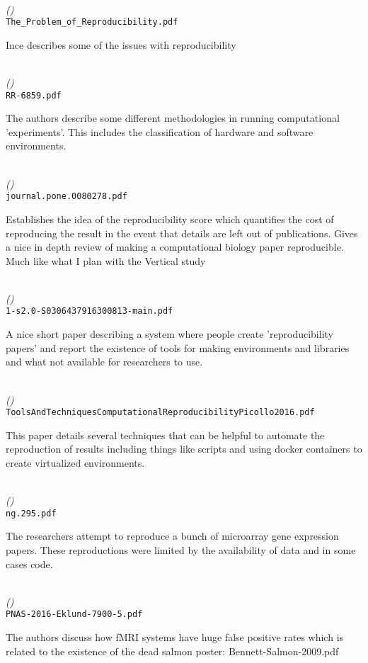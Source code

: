 \documentclass{article}
\newenvironment{refdef}[2] {
	\noindent \textbf{\citetitle{#1}} \cite{#1}\\ \citejournalorbooktitle{#1} \textit{(\citeyear{#1})}\\ \texttt{#2} \vspace{0.2in} \par 
} {
\vspace{0.2in}
}
\begin{document}
\begin{refdef}{problem-of-reproducibility}{The\_Problem\_of\_Reproducibility.pdf}
Ince describes some of the issues with reproducibility
\end{refdef}

\begin{refdef}{classification-of-methodologies-large-scale}{RR-6859.pdf}
The authors describe some different methodologies in running computational 'experiments'. This includes the classification of hardware and software environments.
\end{refdef}

\begin{refdef}{quantifying-reproducibility-computational-biology}{journal.pone.0080278.pdf}
Establishes the idea of the reproducibility score which quantifies the cost of reproducing the result in the event that details are left out of publications. Gives a nice in depth review of making a computational biology paper reproducible. Much like what I plan with the Vertical study
\end{refdef}

\begin{refdef}{collaborative-reproducibility}{1-s2.0-S0306437916300813-main.pdf}
A nice short paper describing a system where people create 'reproducibility papers' and report the existence of tools for making environments and libraries and what not available for researchers to use.
\end{refdef}

\begin{refdef}{tools-and-techniques-computational-reproducibility}{ToolsAndTechniquesComputationalReproducibilityPicollo2016.pdf}
This paper details several techniques that can be helpful to automate the reproduction of results including things like scripts and using docker containers to create virtualized environments.
\end{refdef}

\begin{refdef}{repeatability-microarray-gene-expression}{ng.295.pdf}
The researchers attempt to reproduce a bunch of microarray gene expression papers. These reproductions were limited by the availability of data and in some cases code.
\end{refdef}

\begin{refdef}{fmri-false-positives}{PNAS-2016-Eklund-7900-5.pdf}
The authors discuss how fMRI systems have huge false positive rates which is related to the existence of the dead salmon poster: Bennett-Salmon-2009.pdf
\end{refdef}
\end{document}
